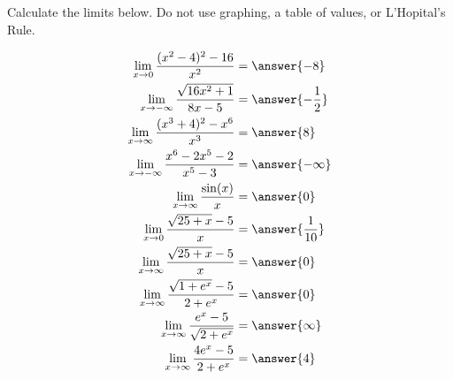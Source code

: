 \documentclass{ximera}
\author{Nela Lakos \and Kyle Parsons \and Bobby Ramsey}
\begin{document}
\begin{exercise}

Calculate the limits below.  Do not use graphing, a table of values, or L'Hopital's Rule.

\begin{align*}
\lim_{x\to0}\frac{(x^2-4)^2 - 16}{x^2} &= \answer{-8}\\
\lim_{x\to-\infty}\frac{\sqrt{16x^2+1}}{8x-5} &= \answer{-\frac{1}{2}}\\
\lim_{x\to\infty}\frac{(x^3+4)^2 - x^6}{x^3} &= \answer{8}\\
\lim_{x\to-\infty}\frac{x^6-2x^5-2}{x^5-3} &= \answer{-\infty}\\
\lim_{x\to\infty}\frac{\sin(x)}{x} &= \answer{0}\\
\lim_{x\to 0}\frac{\sqrt{25+x}-5}{x} &= \answer{\frac{1}{10}}\\
\lim_{x\to\infty}\frac{\sqrt{25+x}-5}{x} &= \answer{0}\\
\lim_{x\to\infty}\frac{\sqrt{1+e^x}-5}{2+e^x} &= \answer{0}\\
\lim_{x\to\infty}\frac{e^x-5}{\sqrt{2+e^x}} &= \answer{\infty}\\
\lim_{x\to\infty}\frac{4e^x-5}{2+e^x} &= \answer{4}\\
\end{align*}

\end{exercise}
\end{document}
